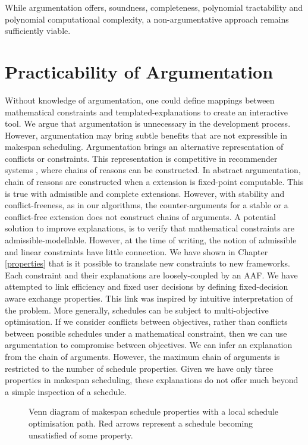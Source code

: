 While argumentation offers, soundness, completeness, polynomial tractability and polynomial computational complexity, a non-argumentative approach remains sufficiently viable.

\section{Practicability of Argumentation}
\label{practicability}

Without knowledge of argumentation, one could define mappings between mathematical constraints and templated-explanations to create an interactive tool. We argue that argumentation is unnecessary in the development process. However, argumentation may bring subtle benefits that are not expressible in makespan scheduling.
\linespace
Argumentation brings an alternative representation of conflicts or constraints. This representation is competitive in recommender systems \cite{recommend}, where chains of reasons can be constructed. In abstract argumentation, chain of reasons are constructed when a extension is fixed-point computable. This is true with admissible and complete extensions. However, with stability and conflict-freeness, as in our algorithms, the counter-arguments for a stable or a conflict-free extension does not construct chains of arguments. A potential solution to improve explanations, is to verify that mathematical constraints are admissible-modellable. However, at the time of writing, the notion of admissible and linear constraints have little connection. 
\linespace
We have shown in Chapter \ref{properties} that is it possible to translate new constraints to new frameworks. Each constraint and their explanations are loosely-coupled by an AAF. We have attempted to link efficiency and fixed user decisions by defining fixed-decision aware exchange properties. This link was inspired by intuitive interpretation of the problem. More generally, schedules can be subject to multi-objective optimisation. If we consider conflicts between objectives, rather than conflicts between possible schedules under a mathematical constraint, then we can use argumentation to compromise between objectives. We can infer an explanation from the chain of arguments. However, the maximum chain of arguments is restricted to the number of schedule properties. Given we have only three properties in makespan scheduling, these explanations do not offer much beyond a simple inspection of a schedule.

\begin{figure}[H]
	\label{problempath}
	
	\caption{Venn diagram of makespan schedule properties with a local schedule optimisation path. Red arrows represent a schedule becoming unsatisfied of some property.}
\end{figure}

